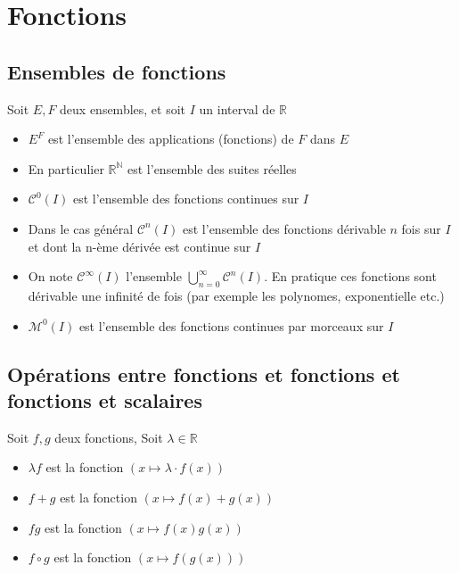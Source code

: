 \documentclass[11pt,colorlinks]{book}
\theoremstyle{mytheoremstyle}
\theoremstyle{mytheoremstyle}
\theoremstyle{mytheoremstyle}
\theoremstyle{mytheoremstyle}
\theoremstyle{mytheoremstyle}
\theoremstyle{mytheoremstyle}
\theoremstyle{mytheoremstyle}
\theoremstyle{mytheoremstyle}
\theoremstyle{myproblemstyle}
\def\mbb#1{\mathbb{#1}}
\def\bN{\mbb{N}}
\def\bR{\mbb{R}}
\def\mC{\mathcal{C}}
\def\mM{\mathcal{M}}
\def\rN{\bR^{\bN}}
\begin{document}
\section{Fonctions}
\subsection{Ensembles de fonctions}
\begin{rmq}
  Soit $E,F$ deux ensembles, et soit $I$ un interval de $\bR$
  \begin{itemize}
    \item $E^{F}$ est l'ensemble des applications (fonctions) de $F$ dans $E$
    \item En particulier $\rN$ est l'ensemble des suites réelles
    \item $\mC^0(I)$ est l'ensemble des fonctions continues sur $I$
    \item Dans le cas général $\mC^n(I)$ est l'ensemble des fonctions dérivable $n$ fois sur $I$ et 
    dont la n-ème dérivée est continue sur $I$
    \item On note $\mC^{\infty}(I)$ l'ensemble $\bigcup_{n=0}^{\infty} \mC^n(I)$. En pratique ces fonctions 
    sont dérivable une infinité de fois (par exemple les polynomes, exponentielle etc.)
    \item $\mM^0(I)$ est l'ensemble des fonctions continues par morceaux sur $I$
  \end{itemize}
\end{rmq}
\subsection{Opérations entre fonctions et fonctions et fonctions et scalaires}
\begin{rmq}
  Soit $f,g$ deux fonctions, Soit $\lambda \in \bR$
  \begin{itemize}
    \item $\lambda f$ est la fonction $\left(x \mapsto \lambda \cdot f(x)\right)$
    \item $f+g$ est la fonction $\left(x \mapsto f(x)+g(x)\right)$
    \item $fg$ est la fonction $\left(x \mapsto f(x)g(x)\right)$
    \item $f \circ g$ est la fonction $\left(x \mapsto f(g(x))\right)$
  \end{itemize}
\end{rmq}
\end{document}
